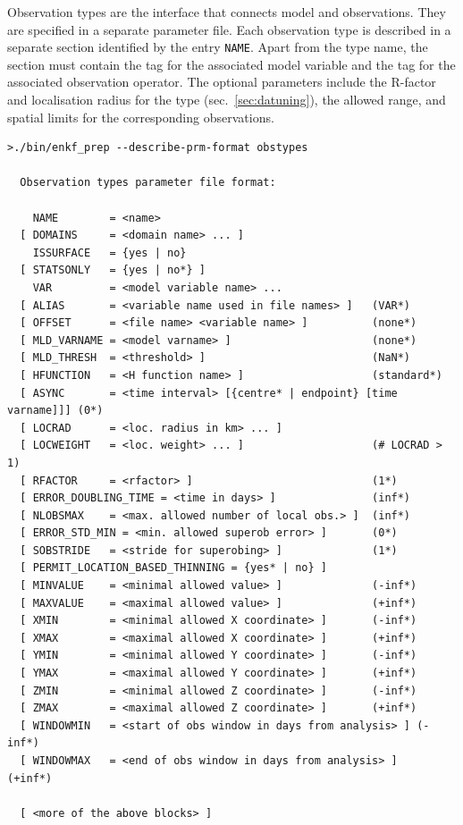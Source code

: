 \documentclass[11pt]{report}
\begin{document}
Observation types are the interface that connects model and observations.
They are specified in a separate parameter file.
Each observation type is described in a separate section identified by the entry \verb|NAME|.
Apart from the type name, the section must contain the tag for the associated model variable and the tag for the associated observation operator.
The optional parameters include the R-factor and localisation radius for the type (sec.~\ref{sec:datuning}), the allowed range, and spatial limits for the corresponding observations.
\begin{Verbatim}[frame=single,fontsize=\footnotesize]
>./bin/enkf_prep --describe-prm-format obstypes

  Observation types parameter file format:

    NAME        = <name>
  [ DOMAINS     = <domain name> ... ]
    ISSURFACE   = {yes | no}
  [ STATSONLY   = {yes | no*} ]
    VAR         = <model variable name> ...
  [ ALIAS       = <variable name used in file names> ]   (VAR*)
  [ OFFSET      = <file name> <variable name> ]          (none*)
  [ MLD_VARNAME = <model varname> ]                      (none*)
  [ MLD_THRESH  = <threshold> ]                          (NaN*)
  [ HFUNCTION   = <H function name> ]                    (standard*)
  [ ASYNC       = <time interval> [{centre* | endpoint} [time varname]]] (0*)
  [ LOCRAD      = <loc. radius in km> ... ]
  [ LOCWEIGHT   = <loc. weight> ... ]                    (# LOCRAD > 1)
  [ RFACTOR     = <rfactor> ]                            (1*)
  [ ERROR_DOUBLING_TIME = <time in days> ]               (inf*)
  [ NLOBSMAX    = <max. allowed number of local obs.> ]  (inf*)
  [ ERROR_STD_MIN = <min. allowed superob error> ]       (0*)
  [ SOBSTRIDE   = <stride for superobing> ]              (1*)
  [ PERMIT_LOCATION_BASED_THINNING = {yes* | no} ]
  [ MINVALUE    = <minimal allowed value> ]              (-inf*)
  [ MAXVALUE    = <maximal allowed value> ]              (+inf*)
  [ XMIN        = <minimal allowed X coordinate> ]       (-inf*)
  [ XMAX        = <maximal allowed X coordinate> ]       (+inf*)
  [ YMIN        = <minimal allowed Y coordinate> ]       (-inf*)
  [ YMAX        = <maximal allowed Y coordinate> ]       (+inf*)
  [ ZMIN        = <minimal allowed Z coordinate> ]       (-inf*)
  [ ZMAX        = <maximal allowed Z coordinate> ]       (+inf*)
  [ WINDOWMIN   = <start of obs window in days from analysis> ] (-inf*)
  [ WINDOWMAX   = <end of obs window in days from analysis> ]   (+inf*)

  [ <more of the above blocks> ]
\end{Verbatim}
\end{document}
